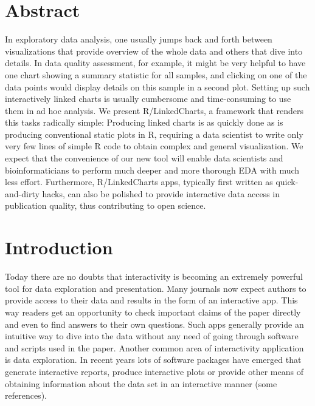 \documentclass[twocolumn,10pt]{article}
\begin{document}
\setcounter{secnumdepth}{0}



\section{Abstract}
In exploratory data analysis, one usually jumps back and forth between visualizations that provide overview of the whole data and others that dive into details. In data quality assessment, for example, it might be very helpful to have one chart showing a summary statistic for all samples, and clicking on one of the data points would display details on this sample in a second plot. Setting up such interactively linked charts is usually cumbersome and time-consuming to use them in ad hoc analysis. We present R/LinkedCharts, a framework  that renders this tasks radically simple: Producing linked charts is as quickly done as is producing conventional static plots in R, requiring a data scientist to write only very few lines of simple R code to obtain complex and general visualization. We expect that the convenience of our new tool will enable data scientists and bioinformaticians to perform much deeper and more thorough EDA with much less effort. Furthermore, R/LinkedCharts apps, typically first written as quick-and-dirty hacks, can also be polished to provide interactive data access in publication quality, thus contributing to open science.

\section{Introduction}
Today there are no doubts that interactivity is becoming an extremely powerful tool for data exploration and presentation. Many journals now expect authors to provide access to their data and results in the form of an interactive app. This way readers get an opportunity to check important claims of the paper directly and even to find answers to their own questions. Such apps generally provide an intuitive way to dive into the data without any need of going through software and scripts used in the paper. Another common area of interactivity application is data exploration. In recent years lots of software packages have emerged that generate interactive reports, produce interactive plots or provide other means of obtaining information about the data set in an interactive manner (some references).
\end{document}
